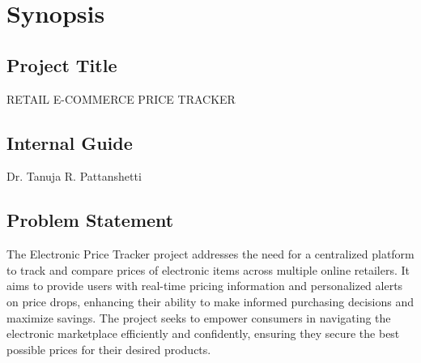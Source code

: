 \documentclass[a4paper,14pt,onecolumn]{report}
\begin{document}
	\chapter{Synopsis}
	
	\section{Project Title}
	\begin{itemize}
		RETAIL E-COMMERCE PRICE TRACKER 
	\end{itemize}
	
	
	\section{Internal Guide}
	\begin{itemize}
		Dr. Tanuja R. Pattanshetti
	\end{itemize}
	
	
	\section{Problem Statement}
	\label{sec:problem}
	\begin{itemize}
		The Electronic Price Tracker project addresses the need for a centralized platform to track and compare prices of electronic items across multiple online retailers. It aims to provide users with real-time pricing information and personalized alerts on price drops, enhancing their ability to make informed purchasing decisions and maximize savings. The project seeks to empower consumers in navigating the electronic marketplace efficiently and confidently, ensuring they secure the best possible prices for their desired products. 
	\end{itemize}
	
\end{document}
